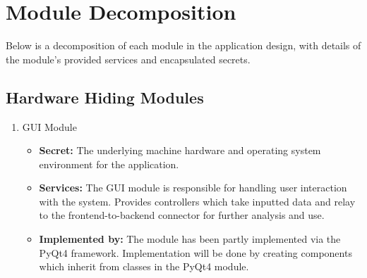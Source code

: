 \documentclass{article}
\begin{document}
\section*{Module Decomposition}
Below is a decomposition of each module in the application design, with details of the module's provided services and encapsulated secrets.

\subsection{Hardware Hiding Modules}
\begin{enumerate}
\item
GUI Module

\begin{itemize}
\item
\textbf{Secret:} The underlying machine hardware and operating system environment for the application.

\item
\textbf{Services:} The GUI module is responsible for handling user interaction with the system. Provides controllers which take inputted data and relay to the frontend-to-backend connector for further analysis and use.

\item
\textbf{Implemented by:} The module has been partly implemented via the PyQt4 framework. Implementation will be done by creating components which inherit from classes in the PyQt4 module.
\end{itemize}
\end{enumerate}
\end{document}
